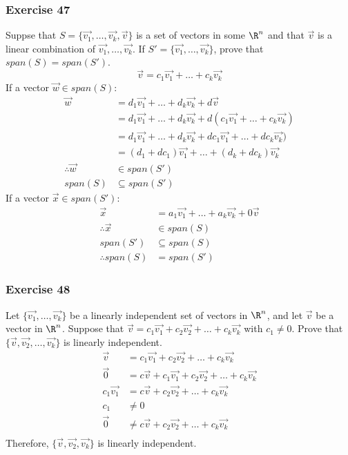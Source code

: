 \documentclass[letterpaper, 12pt]{math}
\begin{document}
\subsubsection*{Exercise 47}
Suppse that \( S = \{\vec{v_1},\dots,\vec{v_k},\vec{v}\} \) is a set of vectors
in some \( \R^n \) and that \( \vec{v} \) is a linear combination of
\( \vec{v_1},\dots,\vec{v_k} \). If \( S' = \{\vec{v_1},\dots,\vec{v_k}\} \),
prove that \( span(S) = span(S') \).
\[ \vec{v} = c_1\vec{v_1}+\dots+c_k\vec{v_k} \]
If a vector \( \vec{w}\in span(S) \):
\begin{align*}
  \vec{w} &= d_1\vec{v_1}+\dots+d_k\vec{v_k}+d\vec{v} \\
  &= d_1\vec{v_1}+\dots+d_k\vec{v_k}+d(c_1\vec{v_1}+\dots+c_k\vec{v_k}) \\
  &= d_1\vec{v_1}+\dots+d_k\vec{v_k}+dc_1\vec{v_1}+\dots+dc_k\vec{v_k}) \\
  &= (d_1+dc_1)\vec{v_1}+\dots+(d_k+dc_k)\vec{v_k} \\
  \therefore \vec{w} &\in span(S') \\
  span(S) &\subseteq span(S')
\end{align*}
If a vector \( \vec{x}\in span(S') \):
\begin{align*}
  \vec{x} &= a_1\vec{v_1}+\dots+a_k\vec{v_k}+0\vec{v} \\
  \therefore \vec{x}&\in span(S) \\
  span(S') &\subseteq span(S) \\
  \therefore span(S) &= span(S')
\end{align*}

\subsubsection*{Exercise 48}
Let \( \{\vec{v_1},\dots,\vec{v_k}\} \) be a linearly independent set of vectors
in \( \R^n \), and let \( \vec{v} \) be a vector in \( \R^n \). Suppose that
\( \vec{v} = c_1\vec{v_1}+c_2\vec{v_2}+\dots+c_k\vec{v_k} \) with \( c_1 \ne 0
\). Prove that \( \{\vec{v},\vec{v_2},\dots,\vec{v_k}\} \) is linearly
independent.
\begin{align*}
  \vec{v} &= c_1\vec{v_1}+c_2\vec{v_2}+\dots+c_k\vec{v_k} \\
  \vec{0} &= c\vec{v}+c_1\vec{v_1}+c_2\vec{v_2}+\dots+c_k\vec{v_k} \\
  c_1\vec{v_1} &= c\vec{v}+c_2\vec{v_2}+\dots+c_k\vec{v_k} \\
  c_1 &\ne 0 \\
  \vec{0} &\ne c\vec{v}+c_2\vec{v_2}+\dots+c_k\vec{v_k} \\
\end{align*}
Therefore, \( \{\vec{v},\vec{v_2},\vec{v_k}\} \) is linearly independent.
\end{document}
